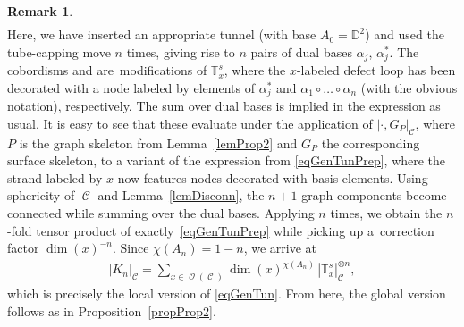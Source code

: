 \documentclass[10pt,a4paper]{amsart}
\DeclareMathOperator{\calc}{\mathcal{C}}
\DeclareMathOperator{\calo}{\mathcal{O}}
\numberwithin{equation}{section}
\theoremstyle{definition}
\newtheorem{Remark}[Remark]{Remark}
\begin{document}
\begin{Remark}
\begin{align*}
 \end{align*}
 Here, we have inserted an appropriate tunnel (with base $A_0 = \mathbb{D}^2$) and used the tube-capping move $n$ times, giving rise to $n$ pairs of dual bases $\alpha_j$, $\alpha_j^*$. The cobordisms  and  are~modifications of $\mathbb{T}_{x}^s$, where the $x$-labeled defect loop has been decorated with a node labeled by elements of $\alpha_j^*$ and $\alpha_1 \circ \dots \circ \alpha_n$ (with the obvious notation), respectively. The sum over dual bases is implied in the expression as usual. It is easy to see that these evaluate under the application of $| \cdot , G_P|_{\calc}$, where $P$ is the graph skeleton from Lemma~\ref{lemProp2} and $G_P$ the corresponding surface skeleton, to a variant of the expression from \eqref{eqGenTunPrep}, where the strand labeled by $x$ now features nodes decorated with basis elements. Using sphericity of $\calc$ and Lemma~\ref{lemDisconn}, the ${n+1}$ graph components become connected while summing over the dual bases. Applying \cite[Lemma~12.3]{TV} $n$ times, we obtain the $n$-fold tensor product of exactly~\eqref{eqGenTunPrep} while picking up a~correction factor $\dim(x)^{-n}$. Since $\chi(A_n) = 1-n$, we arrive at
 \begin{align*}
 |K_n|_{\calc} = \sum_{x \in \calo(\calc)} \dim(x)^{\chi(A_n)} \, |\mathbb{T}_x^s|_{\calc}^{ \otimes n},
 \end{align*}
 which is precisely the local version of \eqref{eqGenTun}. From here, the global version follows as in Proposition~\ref{propProp2}.
\end{Remark}
\end{document}
